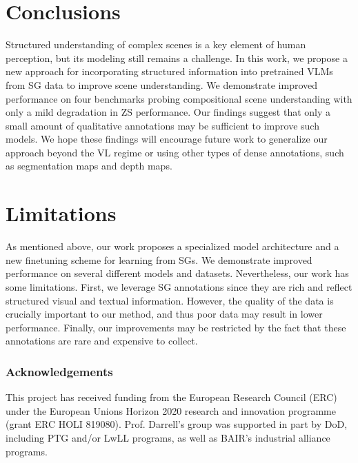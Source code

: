 \documentclass[11pt]{article}
\newcommand\cmr[1]{{#1}}
\begin{document}
\section{Conclusions}


Structured understanding of complex scenes is a key element of human perception, but its modeling still remains a challenge. In this work, we propose a new approach for incorporating structured information into pretrained VLMs from SG data to improve scene understanding. We demonstrate improved performance on four benchmarks probing compositional scene understanding with only a mild degradation in ZS performance. Our findings suggest that only a small amount of qualitative annotations may be sufficient to improve such models. \cmr{We hope these findings will encourage future work to generalize our approach beyond the VL regime or using other types of dense annotations, such as segmentation maps and depth maps.} 













\section{Limitations}


As mentioned above, our work proposes a specialized model architecture and a new finetuning scheme for learning from SGs. We demonstrate improved performance on several different models and datasets. Nevertheless, our work has some limitations. First, we leverage SG annotations since they are rich and reflect structured visual and textual information. However, the quality of the data is crucially important to our method, and thus poor data may result in lower performance. Finally, our improvements may be restricted by the fact that these annotations are rare and expensive to collect. 








\subsubsection*{Acknowledgements}
This project has received funding from the European Research Council (ERC) under the European Unions Horizon 2020 research and innovation programme (grant ERC HOLI 819080). Prof. Darrell’s group was supported in part by DoD, including PTG and/or LwLL programs, as well as BAIR's industrial alliance programs. 
\end{document}
